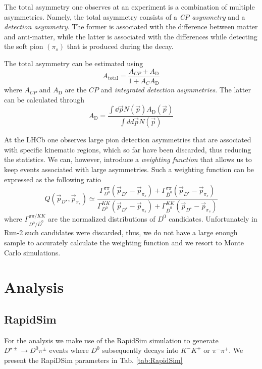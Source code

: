 \documentclass{article}
\begin{document}
        The total asymmetry one observes at an experiment is a combination of multiple asymmetries.
        Namely, the total asymmetry consists of a \textit{CP asymmetry} and a \textit{detection asymmetry}.
        The former is associated with the difference between matter and anti-matter, while the latter is associated with the differences while detecting the soft pion $(\pi_s)$ that is produced during the decay.

        The total asymmetry can be estimated using 
        \begin{equation}
                \label{eq:total}
                A_\text{total} = \frac{A_{CP} + A_\text{D}}{1 + A_{C}A_\text{D}}
        \end{equation}
        where $A_{CP}$ and $A_\text{D}$ are the $CP$ and \textit{integrated detection asymmetries}.
        The latter can be calculated through
        \begin{equation}
                A_\text{D} = \frac{\int \dd \vec{p} N(\vec{p})A_\text{D}(\vec{p})}{\int dd \vec{p} N(\vec{p})}
        \end{equation}

        At the LHCb one observes large pion detection asymmetries that are associated with specific kinematic regions, which so far have been discarded, thus reducing the statistics.
        We can, however, introduce a \textit{weighting function} that allows us to keep events associated with large asymmetries.
        Such a weighting function can be expressed as the following ratio
        \begin{equation}
                \label{eq:weighting}
                Q(\vec{p}_{D^\star}, \vec{p}_{\pi_s}) \simeq \frac{\Gamma_{D^0}^{\pi\pi}(\vec{p}_{D^\star} - \vec{p}_{\pi_s}) + \Gamma_{\bar{D}^0}^{\pi\pi}(\vec{p}_{D^\star} - \vec{p}_{\pi_s})}{\Gamma_{D^0}^{KK}(\vec{p}_{D^\star} - \vec{p}_{\pi_s}) + \Gamma_{\bar{D}^0}^{KK}(\vec{p}_{D^\star} - \vec{p}_{\pi_s})}
        \end{equation}
        where $\Gamma_{D^{0}/\bar{D}^0}^{\pi\pi/KK}$ are the normalized distributions of $D^0$ candidates.
        Unfortunately in Run-2 such candidates were discarded, thus, we do not have a large enough sample to accurately calculate the weighting function and we resort to Monte Carlo simulations.

        
        \section{Analysis}
        \subsection{RapidSim}
        For the analysis we make use of the RapidSim simulation \cite{Cowan:2016tnm} to generate $D^{\star \pm}\to D^0 \pi^\pm$ events where $D^0$ subsequently decays into $K^-K^+$ or $\pi^-\pi^+$.
        We present the RapiDSim parameters in Tab. \ref{tab:RapidSim}
\end{document}
